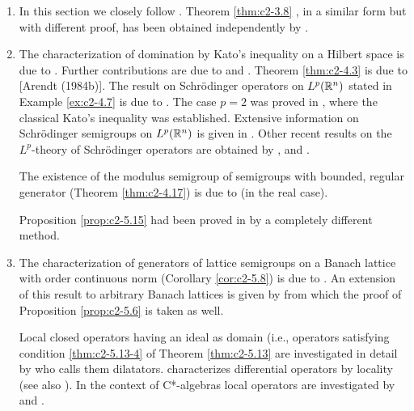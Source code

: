 \begin{enumerate}[label=\emph{Section \arabic*:}, wide]
\item  In this section we closely follow \citet{arendt:1984}. Theorem \ref{thm:c2-3.8}  , in a similar form but with different proof, has been obtained independently by \citet{schep:1985}.

 
\item  The characterization of domination by Kato's inequality on a Hilbert space is due to \citet{simon:1977}. Further contributions are due to \citet{hessschraderuhlenbrock:1977} and \citet{kishimotorobinson:1980}. Theorem \ref{thm:c2-4.3} is due to [Arendt (1984b)]. The result on Schrödinger operators on $L^p(\mathbb{R}^n)$ stated in Example \ref{ex:c2-4.7} is due to \citet{kato:1986}. The case $p = 2$ was proved in \citet{kato:1973}, where the classical Kato's inequality was established. Extensive information on Schrödinger semigroups on $L^p(\mathbb{R}^n)$ is given in \citet{simon:1982}. Other recent results on the $L^p$-theory of Schrödinger operators are obtained by \citet{davies:1986}, \citet{okazawa:1984} and \citet{voigt:1984a}.

The existence of the modulus semigroup of semigroups with bounded, regular generator (Theorem \ref{thm:c2-4.17}) is due to \citet{derndinger:1984} (in the real case).

Proposition \ref{prop:c2-5.15}   had been proved in \citet{schaeferetal:1978} by a completely different method.
 
\item  
The characterization of generators of lattice semigroups on a Banach lattice with order continuous norm (Corollary  \ref{cor:c2-5.8}) is due to \citet{nageluhlig:1981}. An extension of this result to arbitrary Banach lattices is given by \citet{arendt:1982} from which the proof of  Proposition  \ref{prop:c2-5.6}   is taken as well.

Local closed operators having an ideal as domain (i.e., operators satisfying condition \ref{thm:c2-5.13-4} of Theorem \ref{thm:c2-5.13}  are investigated in detail by \citet{nakano:1950} who calls them dilatators. \citet{peetre:1959} characterizes differential operators by locality (see also \citet{luxemburg:1979}). In the context of C*-algebras local operators are investigated by \citet{batty:1985} and \citet{battyrobinson:1985}.

\end{enumerate}

\RaggedRight

